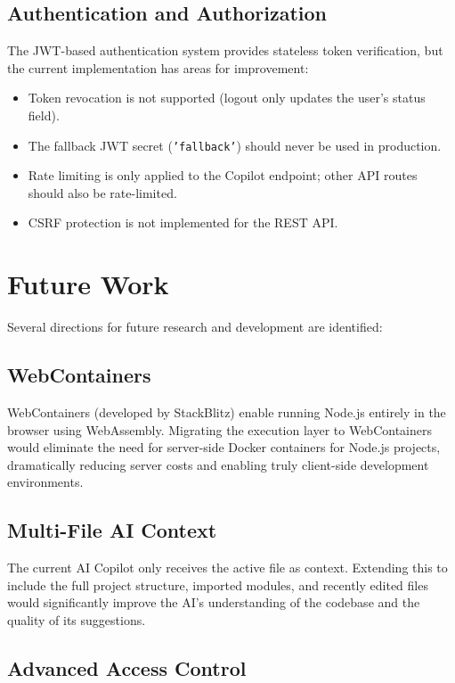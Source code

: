 \documentclass[12pt,a4paper,oneside]{report}
\begin{document}
\subsection{Authentication and Authorization}

The JWT-based authentication system provides stateless token verification, but the current implementation has areas for improvement:

\begin{itemize}
    \item Token revocation is not supported (logout only updates the user's status field).
    \item The fallback JWT secret (\texttt{'fallback'}) should never be used in production.
    \item Rate limiting is only applied to the Copilot endpoint; other API routes should also be rate-limited.
    \item CSRF protection is not implemented for the REST API.
\end{itemize}

\section{Future Work}

Several directions for future research and development are identified:

\subsection{WebContainers}

WebContainers (developed by StackBlitz) enable running Node.js entirely in the browser using WebAssembly. Migrating the execution layer to WebContainers would eliminate the need for server-side Docker containers for Node.js projects, dramatically reducing server costs and enabling truly client-side development environments.

\subsection{Multi-File AI Context}

The current AI Copilot only receives the active file as context. Extending this to include the full project structure, imported modules, and recently edited files would significantly improve the AI's understanding of the codebase and the quality of its suggestions.

\subsection{Advanced Access Control}
\end{document}
